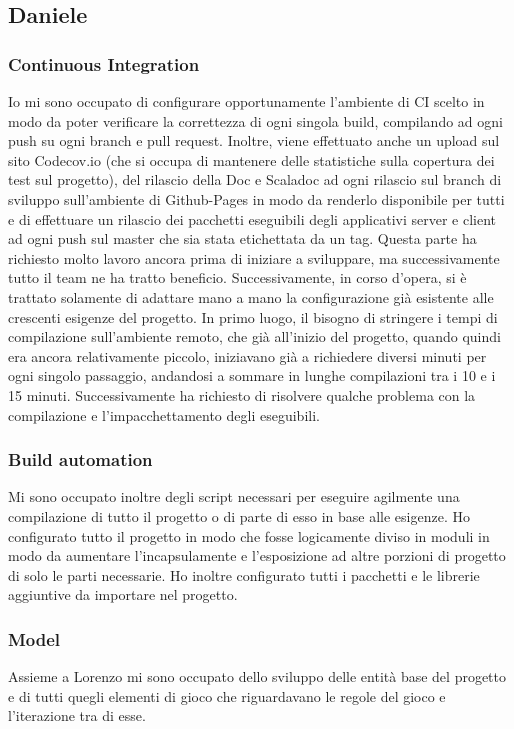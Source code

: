 \documentclass{article}
\begin{document}
    \subsection{Daniele}

    \subsubsection{Continuous Integration}
    Io mi sono occupato di configurare opportunamente l'ambiente di CI scelto in modo da poter verificare la
    correttezza di ogni singola build, compilando ad ogni push su ogni branch e pull request. Inoltre, viene
    effettuato anche un upload sul sito Codecov.io (che si occupa di mantenere delle statistiche sulla copertura
    dei test sul progetto), del rilascio della Doc e Scaladoc ad ogni rilascio sul branch di sviluppo sull'ambiente
    di Github-Pages in modo da renderlo disponibile per tutti e di effettuare un rilascio dei pacchetti eseguibili
    degli applicativi server e client ad ogni push sul master che sia stata etichettata da un tag. Questa parte
    ha richiesto molto lavoro ancora prima di iniziare a sviluppare, ma successivamente tutto il team ne ha tratto
    beneficio. Successivamente, in corso d'opera, si è trattato solamente di adattare mano a mano la configurazione
    già esistente alle crescenti esigenze del progetto. In primo luogo, il bisogno di stringere i tempi di compilazione
    sull'ambiente remoto, che già all'inizio del progetto, quando quindi era ancora relativamente piccolo, iniziavano
    già a richiedere diversi minuti per ogni singolo passaggio, andandosi a sommare in lunghe compilazioni tra i
    10 e i 15 minuti. Successivamente ha richiesto di risolvere qualche problema con la compilazione e l'impacchettamento
    degli eseguibili.

    \subsubsection{Build automation}
    Mi sono occupato inoltre degli script necessari per eseguire agilmente una compilazione di tutto il progetto
    o di parte di esso in base alle esigenze. Ho configurato tutto il progetto in modo che fosse logicamente diviso
    in moduli in modo da aumentare l'incapsulamente e l'esposizione ad altre porzioni di progetto di solo le parti
    necessarie. Ho inoltre configurato tutti i pacchetti e le librerie aggiuntive da importare nel progetto.

    \subsubsection{Model}
    Assieme a Lorenzo mi sono occupato dello sviluppo delle entità base del progetto e di tutti quegli elementi
    di gioco che riguardavano le regole del gioco e l'iterazione tra di esse.
\end{document}
